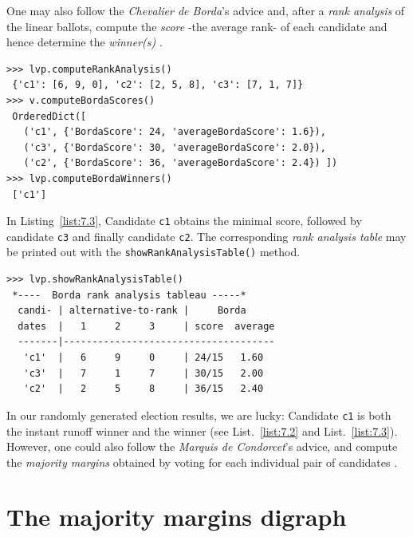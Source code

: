 One may also follow the \emph{Chevalier de Borda}'s advice and, after a \emph{rank analysis} of the linear ballots, compute the \Borda \emph{score} -the average rank- of each candidate and hence determine the \Borda \emph{winner(s)} \citep{BOR-1781}.
\begin{lstlisting}[caption={Example of \Borda rank scores},label=list:7.3]
>>> lvp.computeRankAnalysis()
 {'c1': [6, 9, 0], 'c2': [2, 5, 8], 'c3': [7, 1, 7]}
>>> v.computeBordaScores()
 OrderedDict([
   ('c1', {'BordaScore': 24, 'averageBordaScore': 1.6}),
   ('c3', {'BordaScore': 30, 'averageBordaScore': 2.0}),
   ('c2', {'BordaScore': 36, 'averageBordaScore': 2.4}) ])
>>> lvp.computeBordaWinners()
 ['c1']
\end{lstlisting}

In  Listing~\vref{list:7.3}, Candidate \texttt{c1} obtains the minimal \Borda score, followed by candidate \texttt{c3} and finally candidate \texttt{c2}. The corresponding \Borda \emph{rank analysis table} may be printed out with the \texttt{showRankAnalysisTable()} method.
\begin{lstlisting}[caption={Rank analysis example with \Borda scores},label=list:7.4]
>>> lvp.showRankAnalysisTable()
 *----  Borda rank analysis tableau -----*
  candi- | alternative-to-rank |     Borda 
  dates  |   1     2     3     | score  average
  -------|-------------------------------------
   'c1'  |   6     9     0     | 24/15   1.60
   'c3'  |   7     1     7     | 30/15   2.00
   'c2'  |   2     5     8     | 36/15   2.40
 \end{lstlisting}

In our randomly generated election results, we are lucky: Candidate \texttt{c1} is both the instant runoff winner and the \Borda winner (see List.~\vref{list:7.2} and List.~\vref{list:7.3}). However, one could also follow the \emph{Marquis de Condorcet}'s advice, and compute the \emph{majority margins} obtained by voting for each individual pair of candidates \citep{CON-1784}.

\section{The majority margins digraph}
\label{sec:7.3}

